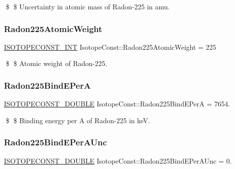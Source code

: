 \$ \$ Uncertainty in atomic mass of Radon-\/225 in amu. \mbox{\label{group___isotope_const-_radon-_rn225_gaff9bde3c0493c9322da565ad9e35b5e6}} 
\subsubsection{\texorpdfstring{Radon225\+Atomic\+Weight}{Radon225AtomicWeight}}
{\footnotesize\ttfamily \mbox{\hyperlink{group___isotope_const-_macros_ga5f18360b3e99483a35c32d789e62621c}{I\+S\+O\+T\+O\+P\+E\+C\+O\+N\+S\+T\+\_\+\+I\+NT}} Isotope\+Const\+::\+Radon225\+Atomic\+Weight = 225}

\$ \$ Atomic weight of Radon-\/225. \mbox{\label{group___isotope_const-_radon-_rn225_gac854d3e4fd43a9f81c980f03bca10695}} 
\subsubsection{\texorpdfstring{Radon225\+Bind\+E\+PerA}{Radon225BindEPerA}}
{\footnotesize\ttfamily \mbox{\hyperlink{group___isotope_const-_macros_ga8f45a7272ce02c0b4c65c44636ed719a}{I\+S\+O\+T\+O\+P\+E\+C\+O\+N\+S\+T\+\_\+\+D\+O\+U\+B\+LE}} Isotope\+Const\+::\+Radon225\+Bind\+E\+PerA = 7654.}

\$ \$ Binding energy per A of Radon-\/225 in keV. \mbox{\label{group___isotope_const-_radon-_rn225_ga209c499db48963580fc8ee62f09b0bcd}} 
\subsubsection{\texorpdfstring{Radon225\+Bind\+E\+Per\+A\+Unc}{Radon225BindEPerAUnc}}
{\footnotesize\ttfamily \mbox{\hyperlink{group___isotope_const-_macros_ga8f45a7272ce02c0b4c65c44636ed719a}{I\+S\+O\+T\+O\+P\+E\+C\+O\+N\+S\+T\+\_\+\+D\+O\+U\+B\+LE}} Isotope\+Const\+::\+Radon225\+Bind\+E\+Per\+A\+Unc = 0.}

